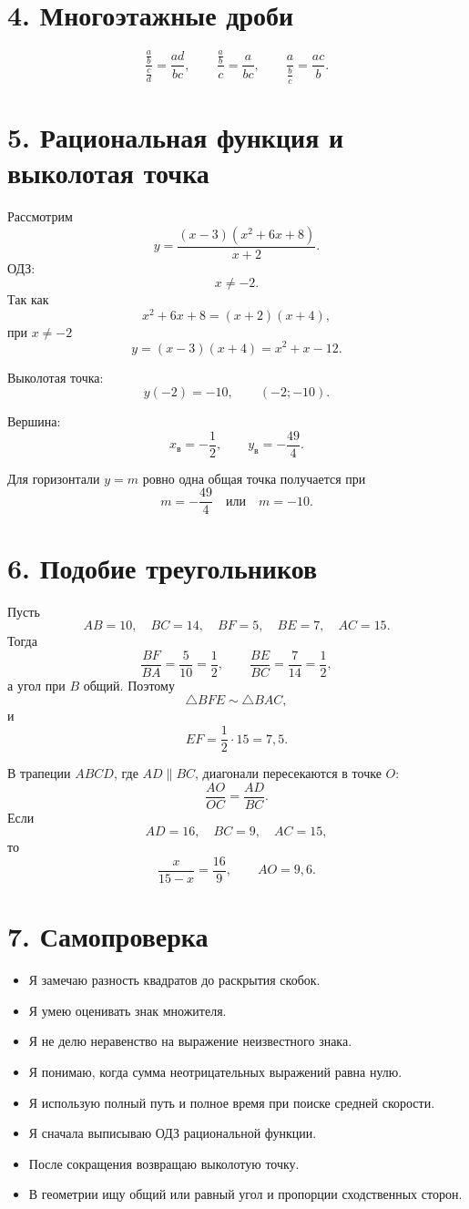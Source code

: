 \documentclass[a4paper,12pt]{article}
\begin{document}
\section*{\color{darkaccent}4. Многоэтажные дроби}

\[
\boxed{\frac{\frac ab}{\frac cd}=\frac{ad}{bc}},
\qquad
\boxed{\frac{\frac ab}{c}=\frac{a}{bc}},
\qquad
\boxed{\frac{a}{\frac bc}=\frac{ac}{b}}.
\]

\section*{\color{darkaccent}5. Рациональная функция и выколотая точка}

Рассмотрим
\[
y=\frac{(x-3)(x^2+6x+8)}{x+2}.
\]
ОДЗ:
\[
x\ne-2.
\]
Так как
\[
x^2+6x+8=(x+2)(x+4),
\]
при \(x\ne-2\)
\[
y=(x-3)(x+4)=x^2+x-12.
\]

Выколотая точка:
\[
y(-2)=-10,
\qquad
\boxed{(-2;-10)}.
\]

Вершина:
\[
x_{\text{в}}=-\frac12,
\qquad
y_{\text{в}}=-\frac{49}{4}.
\]

Для горизонтали \(y=m\) ровно одна общая точка получается при
\[
\boxed{
m=-\frac{49}{4}
\quad\text{или}\quad
m=-10
}.
\]

\section*{\color{darkaccent}6. Подобие треугольников}

Пусть
\[
AB=10,\quad BC=14,\quad BF=5,\quad BE=7,\quad AC=15.
\]
Тогда
\[
\frac{BF}{BA}=\frac{5}{10}=\frac12,
\qquad
\frac{BE}{BC}=\frac{7}{14}=\frac12,
\]
а угол при \(B\) общий. Поэтому
\[
\triangle BFE\sim\triangle BAC,
\]
и
\[
EF=\frac12\cdot15=\boxed{7{,}5}.
\]

В трапеции \(ABCD\), где \(AD\parallel BC\), диагонали пересекаются в точке \(O\):
\[
\frac{AO}{OC}=\frac{AD}{BC}.
\]
Если
\[
AD=16,\quad BC=9,\quad AC=15,
\]
то
\[
\frac{x}{15-x}=\frac{16}{9},
\qquad
\boxed{AO=9{,}6}.
\]

\section*{\color{darkaccent}7. Самопроверка}

\begin{itemize}
\item[$\square$] Я замечаю разность квадратов до раскрытия скобок.
\item[$\square$] Я умею оценивать знак множителя.
\item[$\square$] Я не делю неравенство на выражение неизвестного знака.
\item[$\square$] Я понимаю, когда сумма неотрицательных выражений равна нулю.
\item[$\square$] Я использую полный путь и полное время при поиске средней скорости.
\item[$\square$] Я сначала выписываю ОДЗ рациональной функции.
\item[$\square$] После сокращения возвращаю выколотую точку.
\item[$\square$] В геометрии ищу общий или равный угол и пропорции сходственных сторон.
\end{itemize}
\end{document}
